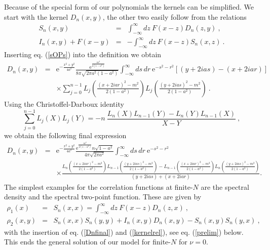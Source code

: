 \documentclass[11pt]{article}
\newcommand{\be}{\begin{equation}}
\newcommand{\ee}{\end{equation}}
\newcommand{\bea}{\begin{eqnarray}}
\newcommand{\eea}{\end{eqnarray}}
\newcommand{\nn}{\nonumber}
\newcommand{\e}{\mbox{e}}
\begin{document}
Because of the special form of our polynomials the kernels can be
simplified. We start with the kernel $D_n(x,y)$, the other two easily
follow from the relations 
\bea
S_n(x,y)&=& \int_{-\infty}^\infty dz\ F(x-z) D_n(z,y)\ ,\nn\\
I_n(x,y)+F(x-y)&=& - \int_{-\infty}^\infty dz\ F(x-z) S_n(x,z)\ .
\label{kernelrel}
\eea
Inserting eq. (\ref{sOPs}) into the definition we obtain
\bea
D_n(x,y)&=&\e^{-\frac{x^2+y^2}{4a^2}}
\frac{\e^{\frac{m^2}{2(1-a^2)}}}{8\pi\sqrt{2\pi    a^2(1-a^2)}} 
\int_{-\infty}^\infty ds\, dr\ \e^{-s^2-r^2}[(y+2ias)-(x+2iar)]\nn\\
&&\times\sum_{j=0}^{n-1}L_j\left( \frac{(x+2iar)^2-m^2}{2(1-a^2)}\right)
L_j\left(\frac{(y+2ias)^2-m^2}{2(1-a^2)}\right)\ .
\label{D1}
\eea
Using the Christoffel-Darboux identity
\be
\sum_{j=0}^{n-1}L_j(X)L_j(Y)=-n\
\frac{L_n(X)L_{n-1}(Y)-L_n(Y)L_{n-1}(X)}{X-Y}\ ,
\ee
we obtain the following final expression
\bea
D_n(x,y)&=&\e^{-\frac{x^2+y^2}{4a^2}}
\frac{\e^{\frac{m^2}{2(1-a^2)}}n\sqrt{1-a^2}}{4\pi\sqrt{2\pi a^2}}
\int_{-\infty}^\infty ds\, dr\ \e^{-s^2-r^2}
\label{Dnfinal}\\
&&\times
\frac{L_n\left(\frac{(x+2iar)^2-m^2}{2(1-a^2)}\right)
L_{n-1}\left(\frac{(y+2ias)^2-m^2}{2(1-a^2)}\right)
- L_{n-1}\left(\frac{(x+2iar)^2-m^2}{2(1-a^2)}\right)
L_{n}\left(\frac{(y+2ias)^2-m^2}{2(1-a^2)}\right)
}{(y+2ias)+(x+2iar)} .\nn
\eea
The simplest examples for the correlation functions at finite-$N$ are
the spectral 
density and the spectral two-point function. These are given by
\bea
\rho_1(x)&=&S_n(x,x)=\int_{-\infty}^\infty dz\ F(x-z) D_n(z,x)\ ,
\nn\\
\rho_2(x,y)&=&S_n(x,x)S_n(y,y)+I_n(x,y)D_n(x,y)-S_n(x,y)S_n(y,x)\ ,
\label{rho1}
\eea
with the insertion of eq. (\ref{Dnfinal}) and (\ref{kernelrel}), see
eq. (\ref{prelim}) below. This
ends the general solution of our model for finite-$N$ for $\nu=0$.\\
\end{document}
